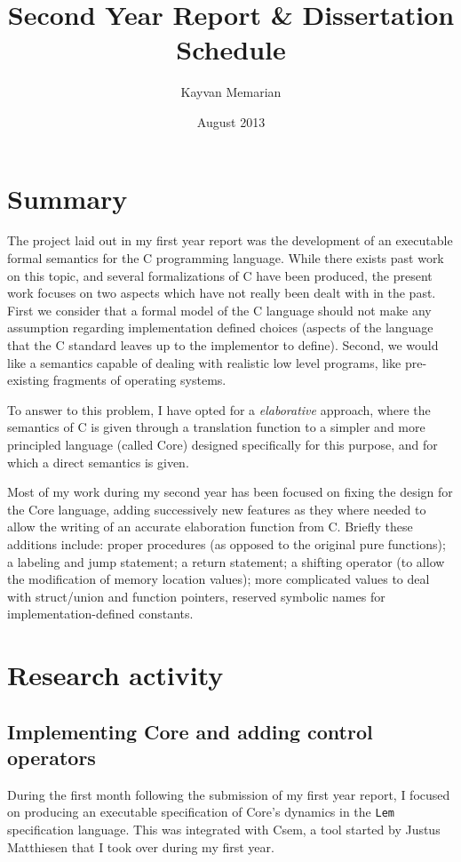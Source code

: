 \documentclass[11pt,a4paper, twocolumn]{article}
\title{Second Year Report \& Dissertation Schedule}
\author{Kayvan Memarian}
\date{August 2013}
\begin{document}
\maketitle

\section*{Summary}

The project laid out in my first year report was the development of an
executable formal semantics for the C programming language. While
there exists past work on this topic, and several formalizations of C
have been produced, the present work focuses on two aspects which have
not really been dealt with in the past. First we consider that a
formal model of the C language should not make any assumption
regarding implementation defined choices (aspects of the language that
the C standard leaves up to the implementor to define). Second, we
would like a semantics capable of dealing with realistic low level
programs, like pre-existing fragments of operating systems.

To answer to this problem, I have opted for a {\it elaborative}
approach, where the semantics of C is given through a translation
function to a simpler and more principled language (called Core)
designed specifically for this purpose, and for which a direct
semantics is given.

Most of my work during my second year has been focused on fixing the
design for the Core language, adding successively new features as they
where needed to allow the writing of an accurate elaboration function
from C. Briefly these additions include: proper procedures (as opposed
to the original pure functions); a labeling and jump statement; a
return statement; a shifting operator (to allow the modification of
memory location values); more complicated values to deal with
struct/union and function pointers, reserved symbolic names for
implementation-defined constants.


\section*{Research activity}

\subsection*{Implementing Core and adding control operators}

During the first month following the submission of my first year
report, I focused on producing an executable specification of Core's
dynamics in the \texttt{Lem} specification language. This was
integrated with Csem, a tool started by Justus Matthiesen that I took
over during my first year.
\end{document}
